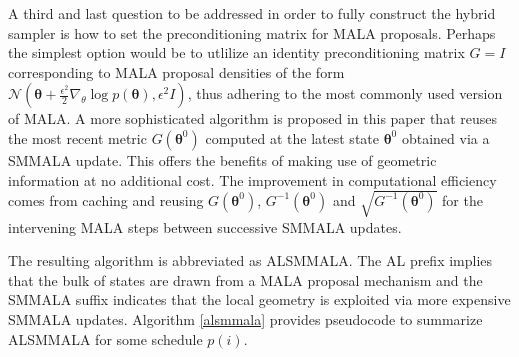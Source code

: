 \documentclass[twoside,11pt]{article}
\begin{document}
A third and last question to be addressed in order to fully construct the hybrid sampler is how to set the preconditioning 
matrix for MALA proposals. Perhaps the simplest option would be to utlilize an identity preconditioning matrix $G=I$ 
corresponding to MALA proposal densities of the form
$\mathcal{N}(\boldsymbol{\theta}+\frac{\epsilon^2}{2}\nabla_{\theta}\log{p(\boldsymbol{\theta})}, \epsilon^2 I)$,
thus adhering to the most commonly used version of MALA. A more sophisticated algorithm is proposed in this paper that 
reuses the most recent metric $G(\boldsymbol{\theta}^0)$ computed at the latest state $\boldsymbol{\theta}^0$ obtained via a 
SMMALA update. This offers the benefits of making use of geometric information at no additional cost. The improvement in 
computational efficiency comes from caching and reusing $G(\boldsymbol{\theta}^0)$, $G^{-1}(\boldsymbol{\theta}^0)$ and 
$\sqrt{G^{-1}(\boldsymbol{\theta}^0)}$ for the intervening MALA steps between successive SMMALA updates. 

The resulting algorithm is abbreviated as ALSMMALA. The AL prefix implies that the bulk of states are drawn from a MALA 
proposal mechanism and the SMMALA suffix indicates that the local geometry is exploited via more expensive SMMALA updates.
Algorithm \ref{alsmmala} provides pseudocode to summarize ALSMMALA for some schedule $p(i)$.
\end{document}
